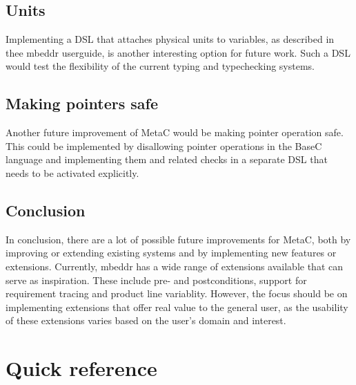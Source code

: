 \documentclass[a4paper,10pt,titlepage]{report}
\begin{document}
\section{Units}
Implementing a DSL that attaches physical units to variables, as described in thee mbeddr userguide, is another interesting option for future work. Such a DSL would test the flexibility of the current typing and typechecking systems.

\section{Making pointers safe}
Another future improvement of MetaC would be making pointer operation safe. This could be implemented by disallowing pointer operations in the BaseC language and implementing them and related checks in a separate DSL that needs to be activated explicitly.

\section{Conclusion}
In conclusion, there are a lot of possible future improvements for MetaC, both by improving or extending existing systems and by implementing new features or extensions. Currently, mbeddr has a wide range of extensions available that can serve as inspiration. These include pre- and postconditions, support for requirement tracing and product line variablity. However, the focus should be on implementing extensions that offer real value to the general user, as the usability of these extensions varies based on the user's domain and interest.  





\appendix
\chapter{Quick reference}
\end{document}
